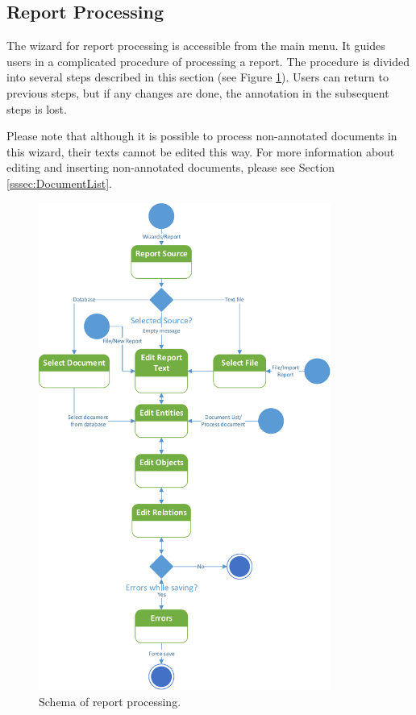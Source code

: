 \subsection{Report Processing}
\label{ssec:ProcessReport}

The wizard for report processing is accessible from the main menu. It guides
users in a complicated procedure of processing a report. The procedure is
divided into several steps described in this section (see Figure
\ref{fig:Pipeline}). Users can return to previous steps, but if any changes are
done, the annotation in the subsequent steps is lost.

Please note that although it is possible to process non-annotated documents in
this wizard, their texts cannot be edited this way. For more information about
editing and inserting non-annotated documents, please see Section
\ref{sssec:DocumentList}.

\begin{figure}[!htb]
        \centering
        \includegraphics[height=16cm,keepaspectratio]{Images/pipeline}
        \caption{Schema of report processing.}
        \label{fig:Pipeline}
\end{figure}

